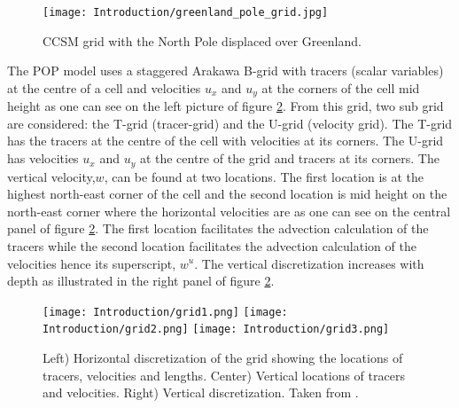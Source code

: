  \begin{figure}[H]
\center
\texttt{[image: Introduction/greenland\_pole\_grid.jpg]}
\caption{CCSM grid with the North Pole displaced over Greenland.}
\label{polegrid}
\end{figure}

The POP model uses a staggered Arakawa B-grid with tracers (scalar variables) at the centre of a cell and velocities $u_x$ and $u_y$ at the corners of the cell mid height as one can see on the left picture of figure \ref{Bgrid}. From this grid, two sub grid are considered: the T-grid (tracer-grid) and the U-grid (velocity grid). The T-grid has the tracers at the centre of the cell with velocities at its corners. The U-grid has velocities $u_x$ and $u_y$ at the centre of the grid and tracers at its corners. The vertical velocity,$w$, can be found at two locations. The first location is at the highest north-east corner of the cell and the second location is mid height on the north-east corner where the horizontal velocities are as one can see on the central panel of figure \ref{Bgrid}. The first location facilitates the advection calculation of the tracers while the second location facilitates the advection calculation of the velocities hence its superscript, $w^u$. The vertical discretization increases with depth as illustrated in the right panel of figure \ref{Bgrid}.

\begin{figure}[H]
\center
\texttt{[image: Introduction/grid1.png]}
\texttt{[image: Introduction/grid2.png]}
\texttt{[image: Introduction/grid3.png]}
\caption{Left) Horizontal discretization of the grid showing the locations of tracers, velocities and lengths. Center) Vertical locations of tracers and velocities. Right) Vertical discretization. Taken from \citet{SmithPop2010}.}
\label{Bgrid}
\end{figure}


